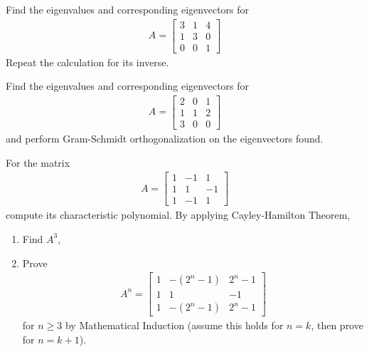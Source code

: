 \begin{Exercise}
Find the eigenvalues and corresponding eigenvectors for
\begin{align*}
A =
\begin{bmatrix}
3 & 1 & 4\\
1 & 3 & 0\\
0 & 0 & 1
\end{bmatrix}
\end{align*}
Repeat the calculation for its inverse.
\end{Exercise}

\begin{Exercise}
Find the eigenvalues and corresponding eigenvectors for
\begin{align*}
A =
\begin{bmatrix}
2 & 0 & 1\\
1 & 1 & 2\\
3 & 0 & 0
\end{bmatrix}
\end{align*}
and perform Gram-Schmidt orthogonalization on the eigenvectors found.
\end{Exercise}

\begin{Exercise}
For the matrix 
\begin{align*}
A = 
\begin{bmatrix}
1 & -1 & 1\\
1 & 1 & -1\\
1 & -1 & 1
\end{bmatrix}
\end{align*}
compute its characteristic polynomial. By applying Cayley-Hamilton Theorem,
\begin{enumerate}[label=(\alph*)]
\item Find $A^{3}$,
\item Prove 
\begin{align*}
A^{n} = \begin{bmatrix}
1 & -(2^n-1) & 2^n-1\\
1 & 1 & -1\\
1 & -(2^n-1) & 2^n-1
\end{bmatrix}
\end{align*}
for $n \geq 3$ by Mathematical Induction (assume this holds for $n = k$, then prove for $n = k+1$).
\end{enumerate}
\end{Exercise}

